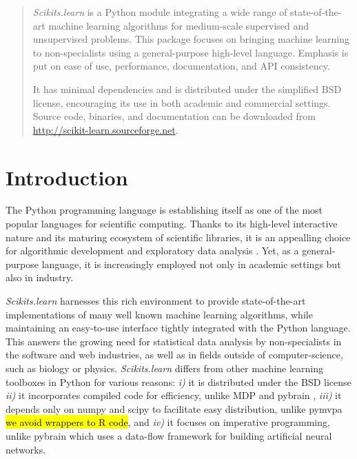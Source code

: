 \documentclass[twoside,11pt]{article}
\begin{document}

\maketitle

\begin{abstract}
%
\emph{Scikits.learn} is a Python module integrating a wide range of
state-of-the-art machine learning algorithms for medium-scale supervised
and unsupervised problems. This package focuses on bringing machine
learning to non-specialists using a general-purpose high-level language.
Emphasis is put on ease of use, performance, documentation, and API
consistency.

%
It has minimal dependencies and is distributed under the simplified BSD
license, encouraging its use in both academic and commercial settings.
Source code, binaries, and documentation can be downloaded from
\url{http://scikit-learn.sourceforge.net}.

\end{abstract}





\section{Introduction}

The Python programming language is establishing itself as one of the
most popular languages for scientific computing. Thanks to its
high-level interactive nature and its maturing ecosystem of scientific
libraries, it is an appealling choice for algorithmic development and
exploratory data analysis \citep{cise2007,cise2011}. Yet, as a
general-purpose language, it is increasingly employed not only in academic
settings but also in industry.

{\sl Scikits.learn} harnesses this rich environment to provide state-of-the-art
implementations of
many well known machine learning algorithms, while maintaining an
easy-to-use interface tightly integrated with the Python language. This answers the
growing need for statistical data analysis by non-specialists in the software and web
industries, as well as in fields outside of computer-science, such as biology or physics.
\emph{Scikits.learn} differs from other machine learning toolboxes in Python for
various reasons: \emph{i)} it is distributed under the BSD license
\emph{ii)} it incorporates compiled code for efficiency, unlike MDP
\citep{zito2008} and pybrain \citep{schaul2010}, \emph{iii)} it depends
only on numpy and scipy to facilitate easy distribution, 
unlike pymvpa \citep{hanke2009} \hl{we avoid wrappers to R code}, and \emph{iv)} it focuses on imperative
programming, unlike pybrain which uses a data-flow framework
for building artificial neural networks.
\end{document}
